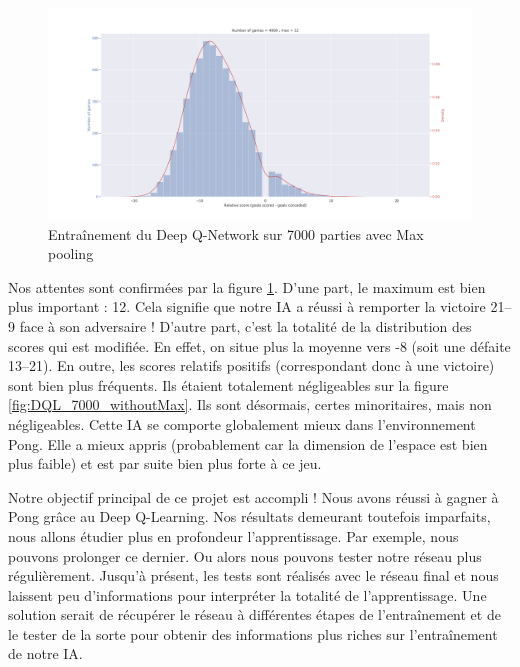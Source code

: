 \begin{figure}[h]
 \centering
 \includegraphics[width  = \textwidth]{img/DQL_7000_withMax.png}
 \caption{Entraînement du Deep Q-Network sur 7000 parties avec Max pooling}
 \label{fig:DQL_7000_withMax}
\end{figure}

Nos attentes sont confirmées par la figure \ref{fig:DQL_7000_withMax}. D'une part, le maximum est bien plus important : 12. Cela signifie que notre IA a 
réussi à remporter la victoire 21--9 face à son adversaire ! D'autre part, c'est la totalité de la distribution des scores qui est modifiée. En effet, on situe 
plus la moyenne vers -8 (soit une défaite 13--21). En outre, les scores relatifs positifs (correspondant donc à une victoire) sont bien plus fréquents. Ils
étaient totalement négligeables sur la figure \ref{fig:DQL_7000_withoutMax}. Ils sont désormais, certes minoritaires, mais non négligeables. Cette IA se comporte
globalement mieux dans l'environnement Pong. Elle a mieux appris (probablement car la dimension de l'espace est bien plus faible) et est par suite bien plus forte
à ce jeu.

Notre objectif principal de ce projet est accompli ! Nous avons réussi à gagner à Pong grâce au Deep Q-Learning. Nos résultats demeurant toutefois imparfaits, nous
allons étudier plus en profondeur l'apprentissage. Par exemple, nous pouvons prolonger ce dernier. Ou alors nous pouvons tester notre réseau plus régulièrement. Jusqu'à
présent, les tests sont réalisés avec le réseau final et nous laissent peu d'informations pour interpréter la totalité de l'apprentissage. Une solution serait de 
récupérer le réseau à différentes étapes de l'entraînement et de le tester de la sorte pour obtenir des informations plus riches sur l'entraînement de notre IA.




















